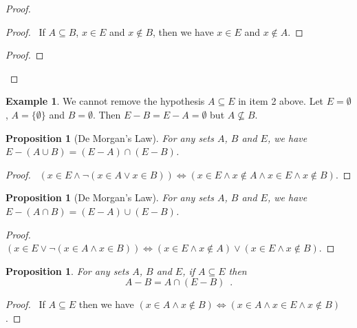 \documentclass{report}
\let\qed\relax
\newtheorem{prop}[ax]{Proposition}
\theoremstyle{definition}
\newtheorem{ex}[ax]{Example}
\begin{document}
\begin{proof}
\pf
{}
\begin{proof}
	\pf\ If $A \subseteq B$, $x \in E$ and $x \notin B$, then we have $x \in E$ and $x \notin A$.
\end{proof}
\begin{proof}
\end{proof}
\qed
\end{proof}

\begin{ex}
We cannot remove the hypothesis $A \subseteq E$ in item 2 above. Let $E = \emptyset$, $A = \{\emptyset\}$ and $B = \emptyset$. Then $E - B = E - A = \emptyset$ but $A \not\subseteq B$.
\end{ex}

\begin{prop}[De Morgan's Law]
For any sets $A$, $B$ and $E$, we have $E - (A \cup B) = (E - A) \cap (E - B)$.
\end{prop}

\begin{proof}
\pf\ $(x \in E \wedge \neg (x \in A \vee x \in B)) \Leftrightarrow (x \in E \wedge x \notin A \wedge x \in E \wedge x \notin B)$. \qed
\end{proof}

\begin{prop}[De Morgan's Law]
For any sets $A$, $B$ and $E$, we have $E - (A \cap B) = (E - A) \cup (E - B)$.
\end{prop}

\begin{proof}
\pf\ $(x \in E \vee \neg (x \in A \wedge x \in B)) \Leftrightarrow (x \in E \wedge x \notin A) \vee (x \in E \wedge x \notin B)$. \qed
\end{proof}

\begin{prop}
For any sets $A$, $B$ and $E$, if $A \subseteq E$ then\
\[ A - B = A \cap (E - B) \enspace . \]
\end{prop}

\begin{proof}
\pf\ If $A \subseteq E$ then we have $(x \in A \wedge x \notin B) \Leftrightarrow (x \in A \wedge x \in E \wedge x \notin B)$. \qed
\end{proof}
\end{document}
